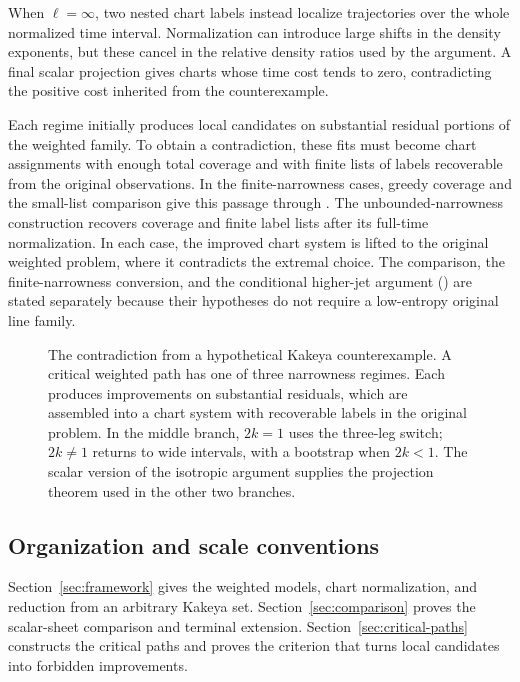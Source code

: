 When \(\ell=\infty\), two nested chart labels instead localize
trajectories over the whole normalized time interval.
Normalization can introduce large shifts in the density exponents,
but these cancel in the relative density ratios used by the
argument. A final scalar projection gives charts whose time cost
tends to zero, contradicting the positive cost inherited from the
counterexample.

Each regime initially produces local candidates on substantial
residual portions of the weighted family. To obtain a contradiction,
these fits must become chart assignments with enough total coverage
and with finite lists of labels recoverable from the original
observations. In the finite-narrowness cases, greedy coverage and
the small-list comparison give this passage through
. The unbounded-narrowness construction
recovers coverage and finite label lists after its full-time
normalization. In each case, the improved chart system is lifted
to the original weighted problem, where it contradicts the extremal
choice. The comparison, the finite-narrowness conversion, and the
conditional higher-jet argument () are stated
separately because their hypotheses do not require a low-entropy
original line family.

\begin{figure}[t]
 \centering
 
 \caption{The contradiction from a hypothetical Kakeya counterexample.
 A critical weighted path has one of three narrowness regimes.
 Each produces improvements on substantial residuals, which are
 assembled into a chart system with recoverable labels in the
 original problem. In the middle branch, \(2k=1\) uses the three-leg
 switch; \(2k\ne1\) returns to wide intervals, with a bootstrap
 when \(2k<1\). The scalar version of the isotropic argument supplies
 the projection theorem used in the other two branches.}
 \label{fig:proof-map}
\end{figure}

\subsection{Organization and scale conventions}

Section~\ref{sec:framework} gives the weighted models, chart
normalization, and reduction from an arbitrary Kakeya set.
Section~\ref{sec:comparison} proves the scalar-sheet comparison and
terminal extension. Section~\ref{sec:critical-paths} constructs the
critical paths and proves the criterion that turns local candidates
into forbidden improvements.

